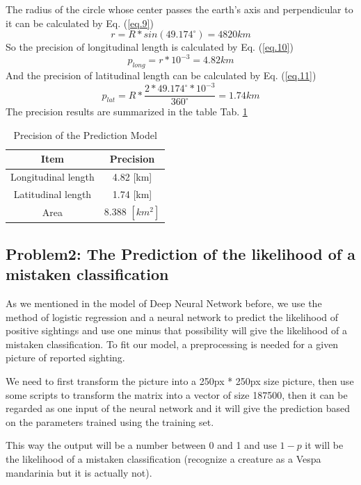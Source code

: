 \documentclass{mcmthesis}
\begin{document}
The radius of the circle whose center passes the earth's axis and perpendicular to it can be calculated by Eq. (\ref{eq.9})
\begin{equation}
	r=R*sin(49.174^\circ)=4820km
	\label{eq.9}
\end{equation}
So the precision of longitudinal length is calculated by Eq. (\ref{eq.10})
\begin{equation}
	p_{long}=r*10^{-3}=4.82km
	\label{eq.10}
\end{equation}
And the precision of latitudinal length can be calculated by Eq. (\ref{eq.11})
\begin{equation}
	p_{lat}=R*\frac{2*49.174^\circ*10^{-3}}{360^\circ}=1.74km
	\label{eq.11}
\end{equation}
The precision results are summarized in the table Tab. \ref{tab:3}
\begin{table}[htbp]
\centering
\begin{tabular}{cc}
\hline
Item & Precision\\
\hline
Longitudinal length & 4.82 [km]\\
Latitudinal length & 1.74 [km]\\
Area & 8.388 $[km^{2}]$\\

\hline
\end{tabular}
\caption{Precision of the Prediction Model}
\label{tab:3}
\end{table}


\subsection{Problem2: The Prediction of the likelihood of a mistaken classification}
As we mentioned in the model of Deep Neural Network before, we use the method of logistic regression and a neural network to predict the likelihood of positive sightings and use one minus that possibility will give the  likelihood of a mistaken classification. To fit our model, a preprocessing is needed for a given picture of reported sighting.

We need to first transform the picture into a 250px * 250px size picture, then use some scripts to transform the matrix into a vector of size 187500, then it can be regarded as one input of the neural network and it will give the prediction based on the parameters trained using the training set.

This way the output will be a number between 0 and 1 and use $1 - p$ it will be the  likelihood of a mistaken classification (recognize a creature as a Vespa mandarinia but it is actually not).
\end{document}
